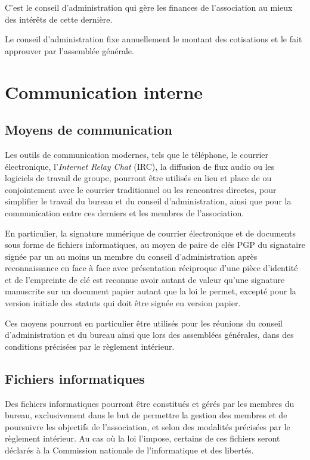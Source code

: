 \documentclass[a4wide,12pt]{scrartcl}
\begin{document}
C'est le conseil d'administration qui gère les finances de
l'association au mieux des intérêts de cette dernière.

Le conseil d'administration fixe annuellement le montant des
cotisations et le fait approuver par l'assemblée générale.

\section{Communication interne}

\subsection{Moyens de communication}

Les outils de communication modernes, tels que le téléphone, le
courrier électronique, l'\textit{Internet Relay Chat} (IRC), la
diffusion de flux audio ou les logiciels de travail de groupe, pourront
être utilisés en lieu et place de ou conjointement avec le courrier
traditionnel ou les rencontres directes, pour simplifier le travail du
bureau et du conseil d'administration, ainsi que pour la communication
entre ces derniers et les membres de l'association.

En particulier, la signature numérique de courrier électronique et de
documents sous forme de fichiers informatiques, au moyen de paire de
clés PGP du signataire signée par un au moins un membre du conseil
d'administration après reconnaissance en face à face avec présentation
réciproque d'une pièce d'identité et de l'empreinte de clé est
reconnue avoir autant de valeur qu'une signature manuscrite sur un
document papier autant que la loi le permet, excepté pour la version
initiale des statuts qui doit être signée en version papier.

Ces moyens pourront en particulier être utilisés pour les réunions du
conseil d'administration et du bureau ainsi que lors des assemblées
générales, dans des conditions précisées par le règlement intérieur.

\subsection{Fichiers informatiques}

Des fichiers informatiques pourront être constitués et gérés par les
membres du bureau, exclusivement dans le but de permettre la gestion
des membres et de poursuivre les objectifs de l'association, et selon
des modalités précisées par le règlement intérieur.  Au cas où la loi
l'impose, certains de ces fichiers seront déclarés à la
Commission nationale de l'informatique et des libertés.
\end{document}
